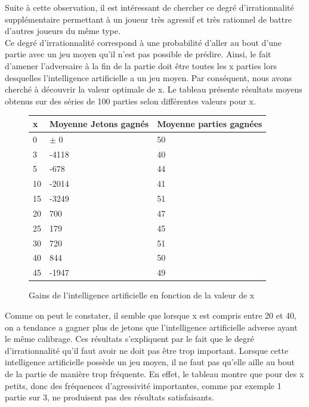 \documentclass{report}
\begin{document}
Suite à cette observation, il est intéressant de chercher ce degré d'irrationnalité supplémentaire permettant à un joueur très agressif et très rationnel de battre d'autres joueurs du même type.\\
 
Ce degré d'irrationnalité correspond à une probabilité d'aller au bout d'une partie avec un jeu moyen qu'il n'est pas possible de prédire. Ainsi, le fait d'amener l'adversaire à la fin de la partie doit être toutes les x parties lors desquelles l'intelligence artificielle a un jeu moyen. Par conséquent, nous avons cherché à découvrir la valeur optimale de x. Le tableau présente résultats moyens obtenus sur des séries de 100 parties selon différentes valeurs pour x. \\ 

\begin{figure}[H]
\begin{center}
\begin{tabular}{|l|l|l|}
\hline
x &	Moyenne Jetons gagnés &	Moyenne parties gagnées \\
\hline
0 &	$\pm$ 0	&	50 \\
\hline
3 &	-4118 &	40\\
\hline
5	&-678&	44\\
\hline
10&	-2014	&41\\
\hline
15&	-3249&	51\\
\hline
20&	700	&47\\
\hline
25&	179&	45\\
\hline
30&	720 &	51\\
\hline
40 &	844	& 50\\
\hline
45 &	-1947 &	49\\
\hline
\end{tabular}
\caption{Gains de l'intelligence artificielle en fonction de la valeur de x}
\end{center}
\end{figure}


Comme on peut le constater, il semble que lorsque x est compris entre 20 et 40, on a tendance a gagner plus de jetons que l'intelligence artificielle adverse ayant le même calibrage. Ces résultats s'expliquent par le fait que le degré d'irrationnalité qu'il faut avoir ne doit pas être trop important. Lorsque cette intelligence artificielle possède un jeu moyen, il ne faut pas qu'elle aille au bout de la partie de manière trop fréquente. En effet, le tableau montre que pour des x petits, donc des fréquences d'agressivité importantes, comme par exemple 1 partie sur 3, ne produisent pas des résultats satisfaisants.
\end{document}
